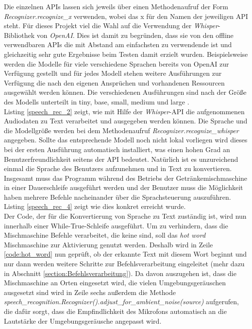 Die einzelnen \ac{API}s lassen sich jeweils über einen Methodenaufruf der Form \textit{Recognizer.recognize\_x} verwenden, wobei das \glqq{}x\grqq{} für den Namen der jeweiligen \ac{API} steht. Für dieses Projekt viel die Wahl auf die Verwendung der \textit{Whisper}-Bibliothek von \textit{OpenAI}. Dies ist damit zu begründen, dass sie von den offline verwendbaren \ac{API}s die mit Abstand am einfachsten zu verwendende ist und gleichzeitig sehr gute Ergebnisse beim Testen damit erzielt wurden. Beispielsweise werden die Modelle für viele verschiedene Sprachen bereits von OpenAI zur Verfügung gestellt und für jedes Modell stehen weitere Ausführungen zur Verfügung die nach den eigenen Ansprüchen und vorhandenen Ressourcen ausgewählt werden können. Die verschiedenen Ausführungen sind nach der \glqq{}Größe\grqq{} des Modells unterteilt in \glqq{}tiny\grqq{}, \glqq{}base\grqq{}, \glqq{}small\grqq{}, \glqq{}medium\grqq{} und \glqq{}large\grqq{} \cite{whisper_repo}.\\

Listing \ref{speech_rec_2} zeigt, wie mit Hilfe der \textit{Whisper}-\ac{API} die aufgenommenen Audiodaten zu Text verarbeitet und ausgegeben werden können. Die Sprache und die Modellgröße werden bei dem Methodenaufruf \textit{Recognizer.recognize\_whisper} angegeben. Sollte das entsprechende Modell noch nicht lokal vorliegen wird dieses bei der ersten Ausführung automatisch installiert, was einen hohen Grad an Benutzerfreundlichkeit seitens der \ac{API} bedeutet. Natürlich ist es unzureichend einmal die Sprache des Benutzers aufzunehmen und in Text zu konvertieren. Insgesamt muss das Programm während des Betriebs der Getränkemischmaschine in einer Dauerschleife ausgeführt werden und der Benutzer muss die Möglichkeit haben mehrere Befehle nacheinander über die Sprachsteuerung auszuführen. Listing \ref{speech_rec_4} zeigt wie dies konkret erreicht wurde.\\
 
Der Code, der für die Konvertierung von Sprache zu Text zuständig ist, wird nun innerhalb einer While-True-Schleife ausgeführt. Um zu verhindern, dass die Mischmaschine Befehle verarbeitet, die keine sind, soll das \textit{hot word} \glqq{}Mischmaschine\grqq{} zur Aktivierung genutzt werden. Deshalb wird in Zeile \ref{code:hot_word} nun geprüft, ob der erkannte Text mit diesem Wort beginnt und nur dann werden weitere Schritte zur Befehlsverarbeitung eingeleitet (mehr dazu in Abschnitt \ref{section:Befehlsverarbeitung}). Da davon auszugehen ist, dass die Mischmaschine an Orten eingesetzt wird, die vielen Umgebungsgeräuschen ausgesetzt sind wird in Zeile sechs außerdem die Methode \textit{speech\_recognition.Recognizer().adjust\_for\_ambient\_noise(source)} aufgerufen, die dafür sorgt, dass die Empfindlichkeit des Mikrofons automatisch an die Lautstärke der Umgebungsgeräusche angepasst wird.\\\\
